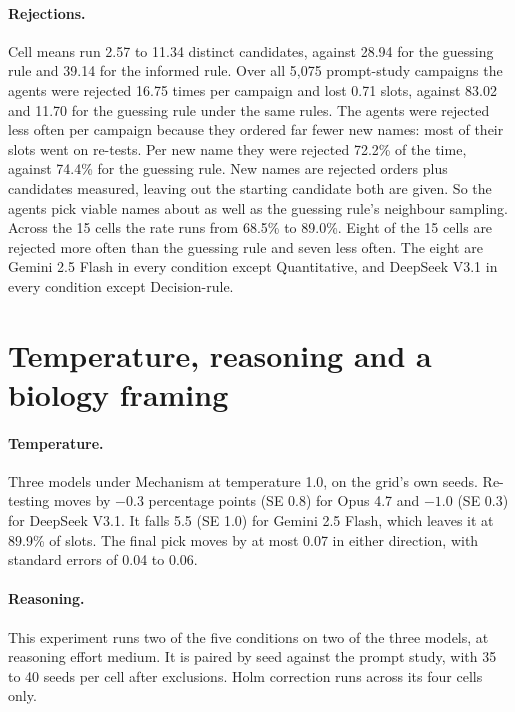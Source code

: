\paragraph{Rejections.} Cell means run 2.57 to 11.34 distinct candidates, against 28.94 for the guessing rule and
39.14 for the informed rule. Over all 5{,}075 prompt-study campaigns the agents were rejected 16.75 times per campaign and
lost 0.71 slots, against 83.02 and 11.70 for the guessing rule under the same rules. The agents were rejected less
often per campaign because they ordered far fewer new names: most of their slots went on re-tests. Per new name they
were rejected 72.2\% of the time, against 74.4\% for the guessing rule. New names are rejected orders plus
candidates measured, leaving out the starting candidate both are given. So the agents pick viable names about as
well as the guessing rule's neighbour sampling. Across the 15 cells the rate runs from 68.5\% to 89.0\%. Eight
of the 15 cells are rejected more often than the guessing rule and seven less often. The eight are Gemini 2.5
Flash in every condition except Quantitative, and DeepSeek V3.1 in every condition except Decision-rule.

\section{Temperature, reasoning and a biology framing}
\label{app:panels}


\paragraph{Temperature.} Three models under Mechanism at temperature 1.0, on the grid's own seeds. Re-testing moves by $-0.3$
percentage points (SE 0.8) for Opus 4.7 and $-1.0$ (SE 0.3) for DeepSeek V3.1. It falls 5.5 (SE 1.0) for Gemini 2.5 Flash, which leaves it at 89.9\% of slots. The final pick
moves by at most 0.07 in either direction, with standard errors of 0.04 to 0.06.

\paragraph{Reasoning.}
\label{app:reasoning}
This experiment runs two of the five conditions on two of the three models, at reasoning effort medium. It is paired by seed against the prompt study, with 35 to 40 seeds per cell after exclusions. Holm correction runs across
its four cells only.

